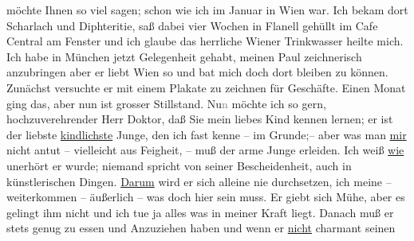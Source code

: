\begin{ledgroupsized}[t]{13cm}
               möchte Ihnen so viel sagen; schon wie ich im Januar in
                  Wien war. Ich bekam dort Scharlach und
               Diphteritie, saß dabei vier Wochen in Flanell gehüllt im Cafe Central am Fenster und ich glaube das herrliche Wiener Trinkwasser heilte mich. Ich habe in München jetzt Gelegenheit gehabt, meinen Paul zeichnerisch anzubringen {\pb}aber er
               liebt Wien so und bat mich doch dort bleiben zu
               können. Zunächst versuchte er mit einem \label{K_L02653-2v}\label{K_L02653-2h} Plakate zu
               zeichnen für Geschäfte. Einen Monat ging das, aber nun ist grosser Stillstand.
                  Nu\textcolor{gray}{n} möchte ich so gern, hochzuverehrender Herr Doktor, daß Sie
               mein liebes Kind kennen
               lernen; er ist der liebste \uline{kindlichste}{ }Junge, den ich fast kenne –
               im Grunde;– aber was man \uline{mir} nicht antut – vielleicht
               aus Feigheit, – muß der arme Junge erleiden. Ich weiß \uline{wie} unerhört er
                  \label{K_L02653-3v}\label{K_L02653-3h}
               wurde; niemand spricht von seiner Bescheidenheit, auch in künstlerischen Dingen. {\pb}\uline{Darum} wird er sich alleine nie durchsetzen, ich meine
               – weiterkommen – äußerlich – was doch \introOben{}hier\introOben{} sein muss. Er
               giebt sich \strikeout{\textcolor{gray}{so}} Mühe, aber es gelingt ihm nicht und ich tue ja alles was in meiner Kraft
               liegt. Danach muß er stets genug zu essen und Anzuziehen haben und wenn er \uline{nicht} charmant seinen \label{K_L02653-5v}
\end{ledgroupsized}
